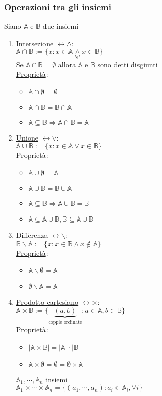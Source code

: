 \documentclass{article}
\newcommand{\ul}[1]{\underline{#1}}
\newcommand{\A}{\mathbb{A}}
\newcommand{\B}{\mathbb{B}}
\begin{document}
\subsubsection*{\color{blue}\ul{Operazioni tra gli insiemi}}
Siano $\A$ e $\B$ due insiemi
\begin{enumerate}
	\item \ul{Intersezione} \color{violet}$\leftrightarrow\wedge$\color{default}:\\
	      $\A\cap\B:=\{x:x\in\A\underset{\text{"e"}}{\wedge} x\in\B\}$\\
	      Se $\A\cap\B=\emptyset$ allora $\A$ e $\B$ sono detti \ul{disgiunti}\\
	      \ul{Proprietà}:
	      \begin{itemize}
		      \item $\A\cap\emptyset=\emptyset$
		      \item $\A\cap\B=\B\cap\A$
		      \item $\A\subseteq\B\Rightarrow\A\cap\B=\A$
	      \end{itemize}
	\item \ul{Unione} \color{violet}$\leftrightarrow\vee$\color{default}:\\
	      $\A\cup\B:=\{x:x\in\A\vee x\in\B\}$\\
	      \ul{Proprietà}:
	      \begin{itemize}
		      \item $\A\cup\emptyset=\A$
		      \item $\A\cup\B=\B\cup\A$
		      \item $\A\subseteq\B\Rightarrow\A\cup\B=\B$
		      \item $\A\subseteq\A\cup\B,\B\subseteq\A\cup\B$
	      \end{itemize}
	\item \ul{Differenza} \color{violet}$\leftrightarrow\backslash$\color{default}:\\
	      $\B\backslash\A:=\{x:x\in\B\wedge x\not\in\A\}$\\
	      \ul{Proprietà}:
	      \begin{itemize}
		      \item $\A\backslash\emptyset=\A$
		      \item $\emptyset\backslash\A=\A$
	      \end{itemize}
	\item \ul{Prodotto cartesiano} \color{violet}$\leftrightarrow\times$\color{default}:\\
	      $\A\times\B:=\{\underbrace{(a,b)}_{\text{coppie ordinate}}:a\in\A,b\in\B\}$\\
	      \ul{Proprietà}:
	      \begin{itemize}
		      \item $|\A\times\B|=|\A|\cdot|\B|$
		      \item $\A\times\emptyset=\emptyset=\emptyset\times\A$
	      \end{itemize}
	      $\A_1,\cdots,\A_n$ insiemi\\
	      $\A_1\times\cdots\times\A_n=\{(a_1,\cdots,a_n):a_i\in\A_i,\forall i\}$
\end{enumerate}
\end{document}
